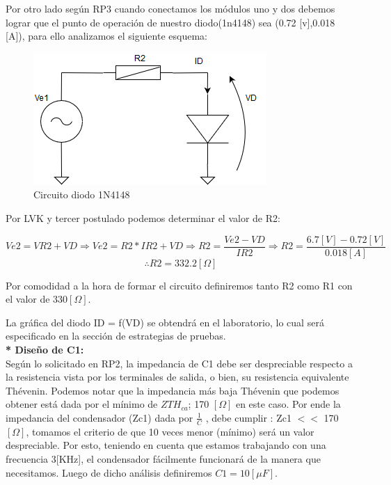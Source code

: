 Por otro lado según RP3 cuando conectamos los módulos uno y dos debemos lograr que el punto de operación de nuestro diodo(1n4148) sea (0.72 [v],0.018 [A]), para ello analizamos el siguiente esquema:\par 
\begin{figure}[h!]
    \Centering
    \includegraphics[scale=0.45]{Imagenes/6DisenoSistema/DISENORP2.png}
    \caption{Circuito diodo 1N4148}
	\label{fig:figure6}
\end{figure}

\newpage

Por LVK y tercer postulado podemos determinar el valor de R2:\par 
\[Ve2 = VR2 + VD \Rightarrow Ve2 = R2*IR2 + VD\Rightarrow R2 = \frac{Ve2 - VD}{IR2}\Rightarrow R2 = \frac{6.7[V]-0.72[V]}{0.018[A]}\]
\[\therefore R2 = 332.2[\Omega]\]

Por comodidad a la hora de formar el circuito definiremos tanto R2 como R1 con el valor de 330$[\Omega]$.\par 

La gráfica del diodo ID = f(VD) se obtendrá en el laboratorio, lo cual será especificado en la sección de estrategias de pruebas.\\[0.5cm]



\textbf{* Diseño de C1:}\\[0.1cm]
Según lo solicitado en RP2, la impedancia de C1 debe ser despreciable respecto a la resistencia vista por los terminales de salida, o bien, su resistencia equivalente Thévenin. Podemos notar que la impedancia más baja Thévenin que podemos obtener está dada por el mínimo de $ZTH_{ca}$; 170 $[\Omega]$ en este caso.
Por ende la impedancia del condensador (Zc1) dada por $\frac{1}{C}$ , debe cumplir :
Zc1 $<<$ 170 $[\Omega]$, tomamos el criterio de que 10 veces menor (mínimo) será un valor despreciable. Por esto, teniendo en cuenta que estamos trabajando con una frecuencia 3[KHz], el condensador fácilmente funcionará de la manera que necesitamos. Luego de dicho análisis definiremos $C1 = 10[\mu F]$.\par 



